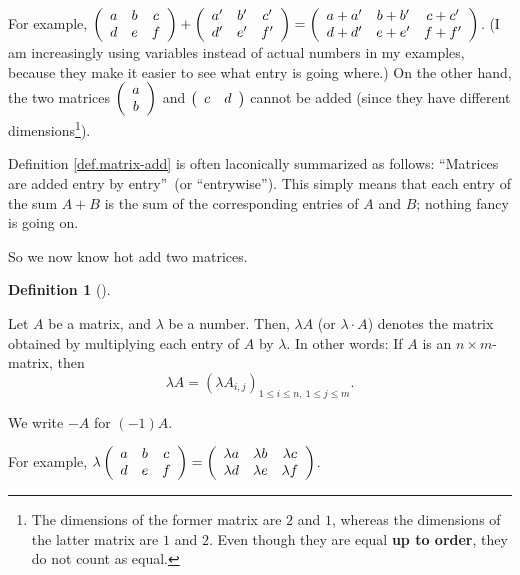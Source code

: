 \documentclass[numbers=enddot,12pt,final,onecolumn,notitlepage]{scrartcl}%
\theoremstyle{definition}
\newtheorem{defi}[theo]{Definition}
\newenvironment{definition}[1][]
{\begin{defi}[#1]\begin{leftbar}}
{\end{leftbar}\end{defi}}
\begin{document}
For example, $\left(
\begin{array}
[c]{ccc}%
a & b & c\\
d & e & f
\end{array}
\right)  +\left(
\begin{array}
[c]{ccc}%
a^{\prime} & b^{\prime} & c^{\prime}\\
d^{\prime} & e^{\prime} & f^{\prime}%
\end{array}
\right)  =\left(
\begin{array}
[c]{ccc}%
a+a^{\prime} & b+b^{\prime} & c+c^{\prime}\\
d+d^{\prime} & e+e^{\prime} & f+f^{\prime}%
\end{array}
\right)  $. (I am increasingly using variables instead of actual numbers in my
examples, because they make it easier to see what entry is going where.) On
the other hand, the two matrices $\left(
\begin{array}
[c]{c}%
a\\
b
\end{array}
\right)  $ and $\left(
\begin{array}
[c]{cc}%
c & d
\end{array}
\right)  $ cannot be added (since they have different dimensions\footnote{The
dimensions of the former matrix are $2$ and $1$, whereas the dimensions of the
latter matrix are $1$ and $2$. Even though they are equal \textbf{up to
order}, they do not count as equal.}).

Definition \ref{def.matrix-add} is often laconically summarized as follows:
\textquotedblleft Matrices are added entry by entry\textquotedblright\ (or
\textquotedblleft entrywise\textquotedblright). This simply means that each
entry of the sum $A+B$ is the sum of the corresponding entries of $A$ and $B$;
nothing fancy is going on.

So we now know hot add two matrices.

\begin{definition}
\label{def.matrix-scale}Let $A$ be a matrix, and $\lambda$ be a number. Then,
$\lambda A$ (or $\lambda\cdot A$) denotes the matrix obtained by multiplying
each entry of $A$ by $\lambda$. In other words: If $A$ is an $n\times
m$-matrix, then%
\[
\lambda A=\left(  \lambda A_{i,j}\right)  _{1\leq i\leq n,\ 1\leq j\leq m}.
\]


We write $-A$ for $\left(  -1\right)  A$.
\end{definition}

For example, $\lambda\left(
\begin{array}
[c]{ccc}%
a & b & c\\
d & e & f
\end{array}
\right)  =\left(
\begin{array}
[c]{ccc}%
\lambda a & \lambda b & \lambda c\\
\lambda d & \lambda e & \lambda f
\end{array}
\right)  $.
\end{document}
